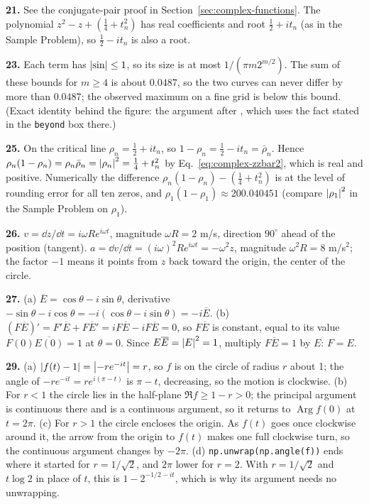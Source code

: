\textbf{21.} See the conjugate-pair proof in Section~\ref{sec:complex-functions}. The polynomial $z^2-z+(\tfrac14+t_n^2)$ has real coefficients and root $\tfrac12+it_n$ (as in the Sample Problem), so $\tfrac12-it_n$ is also a root.

\textbf{23.} Each term has $\left\lvert \sin\right\rvert\le1$, so its size is at most $1/(\pi m2^{m/2})$. The sum of these bounds for $m\ge4$ is about $0.0487$, so the two curves can never differ by more than $0.0487$; the observed maximum on a fine grid is below this bound. (Exact identity behind the figure: the argument after , which uses the fact stated in the \texttt{beyond} box there.)

\textbf{25.} On the critical line $\rho_n=\tfrac12+it_n$, so $1-\rho_n=\tfrac12-it_n=\bar\rho_n$. Hence $\rho_n(1-\rho_n)=\rho_n\bar\rho_n=\left\lvert \rho_n\right\rvert^2=\tfrac14+t_n^2$ by Eq.~\eqref{eq:complex-zzbar2}, which is real and positive. Numerically the difference $\rho_n(1-\rho_n)-(\tfrac14+t_n^2)$ is at the level of rounding error for all ten zeros, and $\rho_1(1-\rho_1)\approx200.040451$ (compare $\left\lvert \rho_1\right\rvert^2$ in the Sample Problem on $\rho_1$).

\textbf{26.} $v=\dd z/\dd t=i\omega Re^{i\omega t}$, magnitude $\omega R=2$ m/s, direction $90^\circ$ ahead of the position (tangent). $a=\dd v/\dd t=(i\omega)^2Re^{i\omega t}=-\omega^2z$, magnitude $\omega^2R=8$ m/s$^2$; the factor $-1$ means it points from $z$ back toward the origin, the center of the circle.

\textbf{27.} (a) $\overline E=\cos\theta-i\sin\theta$, derivative $-\sin\theta-i\cos\theta=-i(\cos\theta-i\sin\theta)=-i\overline E$. (b) $(F\overline E)'=F'\overline E+F\overline E'=iF\overline E-iF\overline E=0$, so $F\overline E$ is constant, equal to its value $F(0)\overline{E(0)}=1$ at $\theta=0$. Since $E\overline E=\left\lvert E\right\rvert^2=1$, multiply $F\overline E=1$ by $E$: $F=E$.

\textbf{29.} (a) $\left\lvert f(t)-1\right\rvert=\left\lvert -re^{-it}\right\rvert=r$, so $f$ is on the circle of radius $r$ about 1; the angle of $-re^{-it}=re^{i(\pi-t)}$ is $\pi-t$, decreasing, so the motion is clockwise. (b) For $r<1$ the circle lies in the half-plane $\Re f\ge1-r>0$; the principal argument is continuous there and is a continuous argument, so it returns to $\operatorname{Arg}f(0)$ at $t=2\pi$. (c) For $r>1$ the circle encloses the origin. As $f(t)$ goes once clockwise around it, the arrow from the origin to $f(t)$ makes one full clockwise turn, so the continuous argument changes by $-2\pi$. (d) \texttt{np.unwrap(np.angle(f))} ends where it started for $r=1/\sqrt2$, and $2\pi$ lower for $r=2$. With $r=1/\sqrt2$ and $t\log2$ in place of $t$, this is $1-2^{-1/2-it}$, which is why its argument needs no unwrapping.

